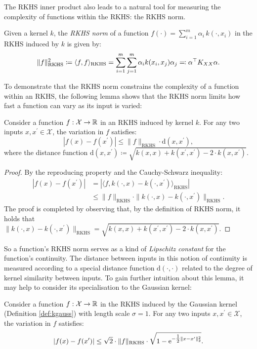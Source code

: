 \begin{refsection}
The RKHS inner product also leads to a natural tool for measuring the complexity of functions within the RKHS: the RKHS norm.
\begin{definition}\label{def:rkhs-norm} Given a kernel $k$, the \textit{RKHS norm} of a function $f(\cdot) = \sum_{i=1}^m \alpha_i\,k(\cdot,x_i)$ in the RKHS induced by $k$ is given by:
\begin{equation*}
    \Vert {f} \Vert_\mathrm{RKHS}^2 \coloneqq \langle f, f \rangle_\mathrm{RKHS} = \sum_{i=1}^m \sum_{j=1}^m \alpha_i k(x_i,x_j) \alpha_j \eqqcolon \alpha^\top K_{XX} \alpha.
\end{equation*}
\end{definition}

To demonstrate that the RKHS norm constrains the complexity of a function within an RKHS, the following lemma shows that the RKHS norm limits how fast a function can vary as its input is varied:

\begin{lemma} Consider a function $f:\mathcal{X}\to\mathbb{R}$ in an RKHS induced by kernel $k$. For any two inputs $x,x^\prime\in\mathcal{X}$, the variation in $f$ satisfies:
\begin{equation}
    \left|f(x) - f(x^\prime)\right| \leq \|f\|_\mathrm{RKHS} \cdot \mathrm{d}(x,x^\prime),
\end{equation}
where the distance function $\mathrm{d}(x,x^\prime)\coloneqq\sqrt{k(x,x) + k(x^\prime,x^\prime) - 2\cdot k(x,x^\prime)}$.
\end{lemma}
\begin{proof} By the reproducing property and the Cauchy-Schwarz inequality:
\begin{align*}
    \left|f(x) - f(x^\prime)\right| &= \left|\langle f, k(\cdot,x)-k(\cdot,x^\prime) \rangle_{\mathrm{RKHS}}\right|\\
    &\leq \|f\|_\mathrm{RKHS} \cdot \|k(\cdot,x)-k(\cdot,x^\prime)\|_\mathrm{RKHS}.
\end{align*}
The proof is completed by observing that, by the definition of RKHS norm, it holds that $\|k(\cdot,x)-k(\cdot,x^\prime)\|_\mathrm{RKHS}=\sqrt{k(x,x) + k(x^\prime,x^\prime) - 2\cdot k(x,x^\prime)}.$
\end{proof}
So a function's RKHS norm serves as a kind of \textit{Lipschitz constant} for the function's continuity. The distance between inputs in this notion of continuity is measured according to a special distance function $\mathrm{d}(\cdot,\cdot)$ related to the degree of kernel similarity between inputs. To gain further intuition about this lemma, it may help to consider its specialisation to the Gaussian kernel:
\begin{corollary}Consider a function $f:\mathcal{X}\to\mathbb{R}$ in the RKHS induced by the Gaussian kernel (Definition \ref{def:kgauss}) with length scale $\sigma=1$. For any two inputs $x,x^\prime\in\mathcal{X}$, the variation in $f$ satisfies:
\begin{equation}
    \left|f(x) - f(x^\prime)\right| \leq \sqrt{2} \cdot \|f\|_\mathrm{RKHS} \cdot \sqrt{1 - \mathrm{e}^{-\tfrac{1}{2}\|x-x^\prime\|_2^2}}.
\end{equation}
\end{corollary}


\end{refsection}
